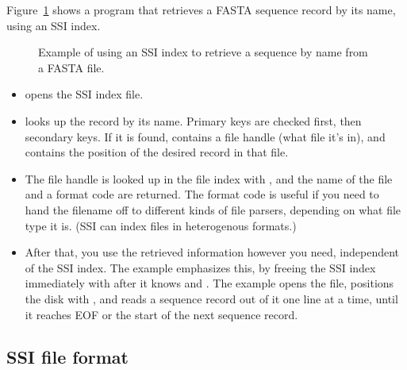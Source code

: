 Figure~\ref{fig:ssi_example2} shows a program that retrieves a FASTA
sequence record by its name, using an SSI index.

\begin{figure}

\caption{Example of using an SSI index to retrieve a sequence by name from a FASTA
  file.}
\label{fig:ssi_example2}
\end{figure}

\begin{itemize}
\item {} opens the SSI index file.

\item {} looks up the record by its name.
      Primary keys are checked first, then secondary keys. If it is
      found,  contains a file handle (what file it's in),
      and  contains the position of the desired record
      in that file.

\item The file handle  is looked up in the file index with
      , and the name of the file and a
      format code are returned. The format code is useful if you need
      to hand the filename off to different kinds of file parsers,
      depending on what file type it is. (SSI can index files in
      heterogenous formats.)

\item After that, you use the retrieved information however you need,
      independent of the SSI index. The example emphasizes this, by
      freeing the SSI index immediately with 
      after it knows  and . The example
      opens the file, positions the disk with , and
      reads a sequence record out of it one line at a time, until it
      reaches EOF or the start of the next sequence record.
\end{itemize}





\subsection{SSI file format} 

